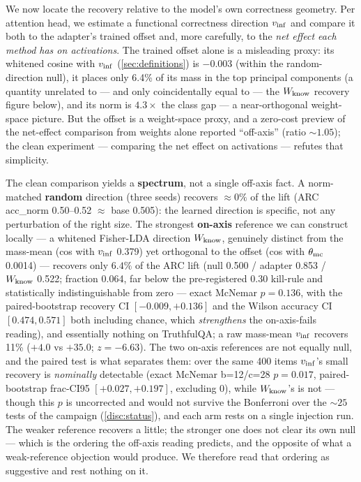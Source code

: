 We now locate the recovery relative to the model's own correctness geometry. Per
attention head, we estimate a functional correctness direction $v_{\mathrm{inf}}$ and compare
it both to the adapter's trained offset and, more carefully, to the \emph{net
effect each method has on activations}. The trained offset alone is a misleading
proxy: its whitened cosine with $v_{\mathrm{inf}}$ (\cref{sec:definitions}) is $-0.003$
(within the random-direction null), it places only 6.4\% of its mass in the top
principal components (a quantity unrelated to --- and only coincidentally equal to
--- the $W_{\mathrm{know}}$ recovery figure below), and its norm is $4.3\times$ the class gap
--- a near-orthogonal weight-space picture. But the offset is a weight-space proxy,
and a zero-cost preview of the net-effect comparison from weights alone reported
``off-axis'' (ratio ${\sim}1.05$); the clean experiment --- comparing the net
effect on activations --- refutes that simplicity.

The clean comparison yields a \textbf{spectrum}, not a single off-axis fact. A
norm-matched \textbf{random} direction (three seeds) recovers ${\approx}0\%$ of the
lift (ARC acc\_norm 0.50--0.52 ${\approx}$ base 0.505): the learned direction is
specific, not any perturbation of the right size. The strongest \textbf{on-axis}
reference we can construct locally --- a whitened Fisher-LDA direction $W_{\mathrm{know}}$,
genuinely distinct from the mass-mean (cos with $v_{\mathrm{inf}}$ 0.379) yet orthogonal to
the offset (cos with $\theta_{\mathrm{mc}}$ 0.0014) --- recovers only $\mathbf{6.4\%}$ of the
ARC lift (null 0.500 / adapter 0.853 / $W_{\mathrm{know}}$ 0.522; fraction 0.064, far below
the pre-registered 0.30 kill-rule and statistically indistinguishable from zero ---
exact McNemar $p=0.136$, with the paired-bootstrap recovery CI $[-0.009, +0.136]$
and the Wilson accuracy CI $[0.474, 0.571]$ both including chance, which
\emph{strengthens} the on-axis-fails reading), and essentially nothing on
TruthfulQA; a raw mass-mean $v_{\mathrm{inf}}$ recovers 11\% ($+4.0$ vs $+35.0$; $z = -6.63$).
The two on-axis references are not equally null, and the paired test is what
separates them: over the same 400 items $v_{\mathrm{inf}}$'s small recovery is \emph{nominally}
detectable
(exact McNemar b=12/c=28 $p=0.017$, paired-bootstrap frac-CI95 $[+0.027, +0.197]$,
excluding 0), while $W_{\mathrm{know}}$'s is not --- though this $p$ is uncorrected and would
not survive the Bonferroni over the ${\sim}25$ tests of the campaign
(\cref{disc:status}), and each arm rests on a single injection run. The weaker
reference recovers a little; the stronger one does not clear its own null --- which
is the ordering the off-axis reading predicts, and the opposite of what a
weak-reference objection would produce. We therefore read that ordering as
suggestive and rest nothing on it.

